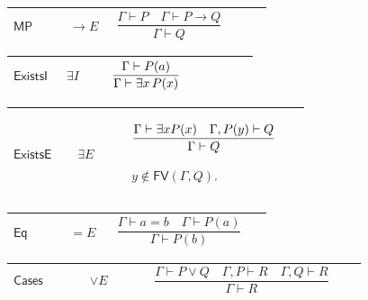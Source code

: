 \documentclass[12pt,reqno]{amsart}
\theoremstyle{blueplain}
\numberwithin{equation}{section}
\begin{document}
{\scriptsize \setlength{\parskip}{0pt}\nointerlineskip
\noindent 
\begin{tabular}{|@{}>{\centering\arraybackslash}m{0.19251\linewidth}|>{\centering\arraybackslash}m{0.16845\linewidth}|>{\centering\arraybackslash}m{0.53904\linewidth}|}
\hline
\hypertarget{rule:MP}{$\displaystyle \mathsf{MP}$} & $\displaystyle \to E$ & 
\rule[-3.3ex]{0pt}{7.8ex}$\displaystyle \dfrac{\Gamma\vdash
P\quad\Gamma\vdash P\to Q}{\Gamma\vdash Q}$ \\ \hline
\end{tabular}%
}

{\scriptsize \setlength{\parskip}{0pt}\nointerlineskip
\noindent 
\begin{tabular}{|@{}>{\centering\arraybackslash}m{0.19251\linewidth}|>{\centering\arraybackslash}m{0.16845\linewidth}|>{\centering\arraybackslash}m{0.53904\linewidth}|}
\hline
\hypertarget{rule:ExistsI}{$\displaystyle \mathsf{ExistsI}$} & $%
\displaystyle \exists I$ & \rule[-3.3ex]{0pt}{7.8ex}$\displaystyle \dfrac{%
\Gamma\vdash P(a)}{\Gamma\vdash\exists x\,P(x)}$ \\ \hline
\end{tabular}%
}

{\scriptsize \setlength{\parskip}{0pt}\nointerlineskip
\noindent 
\begin{tabular}{|@{}>{\centering\arraybackslash}m{0.19251\linewidth}|>{\centering\arraybackslash}m{0.16845\linewidth}|>{\centering\arraybackslash}m{0.53904\linewidth}|}
\hline
\hypertarget{rule:ExistsE}{$\displaystyle \mathsf{ExistsE}$} & $%
\displaystyle \exists E$ & \rule[-3.3ex]{0pt}{7.8ex}$\displaystyle \dfrac{%
\Gamma\vdash\exists xP(x)\quad\Gamma,P(y)\vdash Q}{\Gamma\vdash Q}$\par$%
\displaystyle y\notin\mathsf{FV}(\Gamma,Q).$ \\ \hline
\end{tabular}%
}

{\scriptsize \setlength{\parskip}{0pt}\nointerlineskip
\noindent 
\begin{tabular}{|@{}>{\centering\arraybackslash}m{0.19251\linewidth}|>{\centering\arraybackslash}m{0.16845\linewidth}|>{\centering\arraybackslash}m{0.53904\linewidth}|}
\hline
\hypertarget{rule:Eq}{$\displaystyle \mathsf{Eq}$} & $\displaystyle =E$ & 
\rule[-3.3ex]{0pt}{7.8ex}$\displaystyle \dfrac{\Gamma\vdash
a=b\quad\Gamma\vdash P(a)}{\Gamma\vdash P(b)}$ \\ \hline
\end{tabular}%
}

{\scriptsize \setlength{\parskip}{0pt}\nointerlineskip
\noindent 
\begin{tabular}{|@{}>{\centering\arraybackslash}m{0.19251\linewidth}|>{\centering\arraybackslash}m{0.16845\linewidth}|>{\centering\arraybackslash}m{0.53904\linewidth}|}
\hline
\hypertarget{rule:Cases}{$\displaystyle \mathsf{Cases}$} & $\displaystyle %
\vee E$ & \rule[-3.3ex]{0pt}{7.8ex}$\displaystyle \dfrac{\Gamma\vdash P\lor
Q\quad\Gamma,P\vdash R\quad\Gamma,Q\vdash R}{\Gamma\vdash R}$ \\ \hline
\end{tabular}%
}
\end{document}
